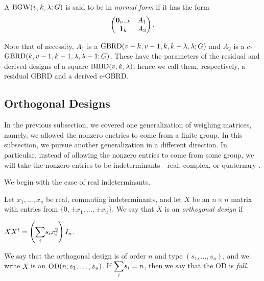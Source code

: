 \documentclass[../../../main]{subfiles}
\begin{document}
 \begin{defin}
  A $\text{BGW}(v,k,\lambda;G)$ is said to be in {\it normal form} if it has the form
  \begin{equation}
   \begin{pmatrix}
    \mathbf{0}_{v-k} & A_1 \\ \mathbf{1}_{k} & A_2
   \end{pmatrix}.
  \end{equation}
 \end{defin}
 
 Note that of necessity, $A_1$ is a $\text{GBRD}(v-k,v-1,k,k-\lambda,\lambda;G)$ and $A_2$ is a $c$-$\text{GBRD}(k,v-1,k-1,\lambda,\lambda-1;G)$. These have the parameters of the residual and derived designs of a square $\text{BIBD}(v,k,\lambda)$, hence we call them, respectively, a residual GBRD and a derived $c$-GBRD.

 \dinkus


 \subsection{Orthogonal Designs}

 In the previous subsection, we covered one generalization of weighing matrices,
 namely, we allowed the nonzero enetries to come from a finite group. In this
 subsection, we pursue another generalization in a different direction. In
 particular, instead of allowing the nonzero entries to come from some group, we
will take the nonzero entries to be indeterminants---real, complex, or
quaternary .

We begin with the case of real indeterminants.

\begin{defin}\label{real-od-def}
  Let $x_1, \dots, x_u$ be real, commuting indeterminants, and let $X$ be an $n \times n$ matrix with entries from $\{0,\pm x_1, \dots, \pm x_u\}$. We say that $X$ is an {\it orthogonal design} if
  \begin{defenum}
  \item $XX^t = \left( \ssum_i s_ix_i^2 \right)I_n$.
  \end{defenum}
  We say that the orthogonal design is of order $n$ and type $(s_1, \dots, s_u)$, and we write $X$ is an $\text{OD}(n;s_1, \dots, s_u)$. If $\ssum_i s_i=n$, then we say that the OD is {\it full}.
\end{defin}
\end{document}
